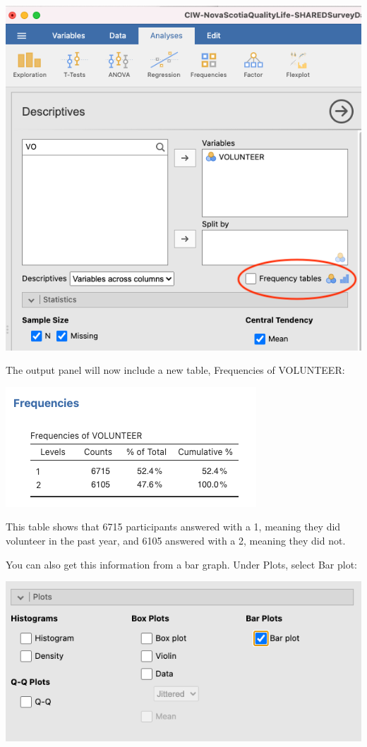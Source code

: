 \documentclass[
]{book}
\begin{document}
\includegraphics{img/frequencytables.png}

The output panel will now include a new table, Frequencies of VOLUNTEER:

\includegraphics{img/volunteerfrequenciestable.png}

This table shows that 6715 participants answered with a 1, meaning they did volunteer in the past year, and 6105 answered with a 2, meaning they did not.

You can also get this information from a bar graph. Under {Plots}, select Bar plot:

\includegraphics{img/barplot.png}
\end{document}
